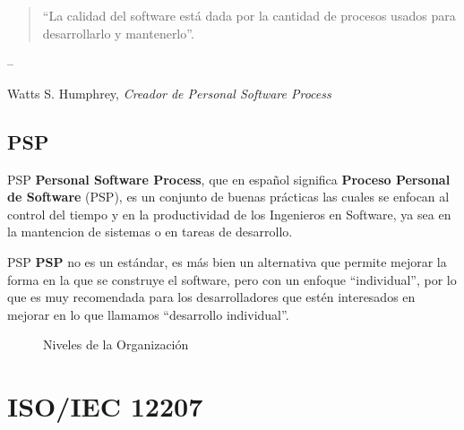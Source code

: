 \documentclass[]{beamer}
\begin{document}
				\begin{frame}
					\begin{quotation}``La calidad del software está dada por la cantidad de procesos usados para desarrollarlo y mantenerlo''.\end{quotation}
			
				\hfill -- \parbox[t]{.9\textwidth}{Watts S. Humphrey,
				\textit{Creador de Personal Software Process}}

				\end{frame}					
		
		\subsection{PSP}
			\begin{frame}{PSP}
				\textbf{Personal Software Process}, que en español significa \textbf{Proceso Personal de Software} (PSP), es un conjunto de buenas pr\'acticas las cuales se enfocan al control del tiempo y en la productividad de los Ingenieros en Software, ya sea en la mantencion de sistemas o en tareas de desarrollo.
			\end{frame}
			
			\begin{frame}{PSP}
				\textbf{PSP} no es un est\'andar, es m\'as bien un alternativa que permite mejorar la forma en la que se construye el software, pero con un enfoque ``individual'', por lo que es muy recomendada para los desarrolladores que estén interesados en mejorar en lo que llamamos ``desarrollo individual''.
				\begin{figure}
    				 \caption{Niveles de la Organización}
				\end{figure}
			\end{frame}
				
\section{ISO/IEC 12207}
\end{document}

